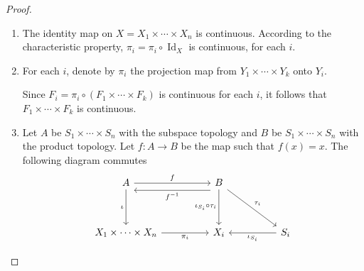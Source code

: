 \begin{proof}
\begin{enumerate}[itemsep=0pt,label={(\alph*)}]
              Let \( f: (X_{1} \times \cdots \times X_{n}, \mathscr{T}_{1}) \to (X_{1} \times \cdots \times X_{n}, \mathscr{T}_{2}) \) be a map such that \( f(x) = x \), then \( f \) is bijective.

              Denote by \( \pi_{i,j}: (X_{1} \times \cdots \times X_{n}, \mathscr{T}_{j}) \to X_{i} \) the projection maps.

              Apply the characteristic property ``four'' times.

              \( \operatorname{Id}_{\mathscr{T}_{1}} \) and \( \operatorname{Id}_{\mathscr{T}_{2}} \) are continuous so \( \pi_{i,2} = \pi_{i,2} \circ \operatorname{Id}_{\mathscr{T}_{1}} \) is continuous and \( \pi_{i,1} = \pi_{i,1} \circ \operatorname{Id}_{\mathscr{T}_{2}} \) is continuous.

              \( \pi_{i,2} \circ f = \pi_{i,1} \) is continuous for each \( i \), so \( f \) is continuous.

              \( \pi_{i,1} \circ f^{-1} = \pi_{i,2} \) is continuous for each \( i \), so \( f^{-1} \) is continuous.

              Hence \( f \) is a homeomorphism, so \( \mathscr{T}_{1} = \mathscr{T}_{2} \), which means the product topology is the only topology on \( X_{1} \times \cdots \times X_{n} \) for which the characteristic property holds.
        \item The identity map on \( X = X_{1} \times \cdots \times X_{n} \) is continuous. According to the characteristic property, \( \pi_{i} = \pi_{i} \circ \operatorname{Id}_{X} \) is continuous, for each \( i \).
        \item For each \( i \), denote by \( \pi_{i} \) the projection map from \( Y_{1} \times \cdots \times Y_{k} \) onto \( Y_{i} \).

              Since \( F_{i} = \pi_{i} \circ (F_{1} \times \cdots \times F_{k}) \) is continuous for each \( i \), it follows that \( F_{1} \times \cdots \times F_{k} \) is continuous.
        \item Let \( A \) be \( S_{1} \times \cdots \times S_{n} \) with the subspace topology and \( B \) be \( S_{1} \times \cdots \times S_{n} \) with the product topology. Let \( f: A \to B \) be the map such that \( f(x) = x \). The following diagram commutes
              \[
                  \begin{tikzcd}
                      A && B \\
                      \\
                      {X_{1} \times \cdots \times X_{n}} && {X_{i}} && {S_{i}}
                      \arrow["f", from=1-1, to=1-3]
                      \arrow["\iota"', from=1-1, to=3-1]
                      \arrow["{f^{-1}}", shift left=3, from=1-3, to=1-1]
                      \arrow["{\iota_{S_{i}} \circ \tau_{i}}"', from=1-3, to=3-3]
                      \arrow["{\tau_{i}}", from=1-3, to=3-5]
                      \arrow["{\pi_{i}}"', from=3-1, to=3-3]
                      \arrow["{\iota_{S_{i}}}", from=3-5, to=3-3]
                  \end{tikzcd}
              \]


\end{enumerate}
\end{proof}
